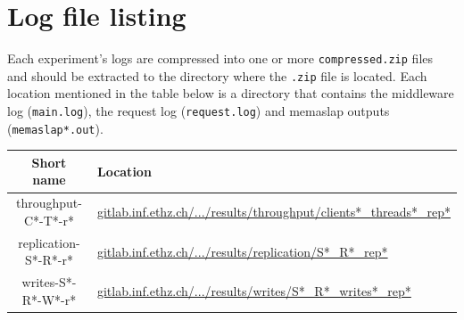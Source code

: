 \documentclass[11pt]{article}
\begin{document}
\clearpage

\section*{Log file listing}

Each experiment's logs are compressed into one or more \verb+compressed.zip+ files and should be extracted to the directory where the \verb+.zip+ file is located. Each location mentioned in the table below is a directory that contains the middleware log (\verb+main.log+), the request log (\verb+request.log+) and memaslap outputs (\verb+memaslap*.out+). \\

\begin{tabular}{|c|l|}
\hline \textbf{Short name}& \textbf{Location} \\ 
\hline throughput-C*-T*-r* & \href{https://gitlab.inf.ethz.ch/pungast/asl-fall16-project/blob/master/results/throughput}{gitlab.inf.ethz.ch/.../results/throughput/clients*\_threads*\_rep*} \\ 
\hline replication-S*-R*-r* & \href{https://gitlab.inf.ethz.ch/pungast/asl-fall16-project/blob/master/results/replication}{gitlab.inf.ethz.ch/.../results/replication/S*\_R*\_rep*} \\ 
\hline writes-S*-R*-W*-r* & \href{https://gitlab.inf.ethz.ch/pungast/asl-fall16-project/blob/master/results/writes}{gitlab.inf.ethz.ch/.../results/writes/S*\_R*\_writes*\_rep*} \\ 
\hline 
\end{tabular} 
 
\end{document}
